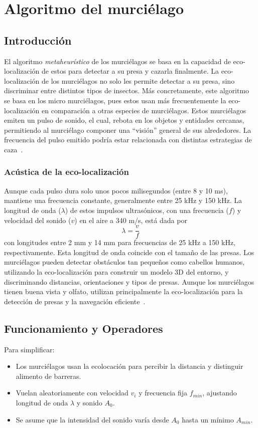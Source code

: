\section{Algoritmo del murciélago}
\subsection{Introducción}
El algoritmo \textit{metaheurístico} de los murciélagos se basa en la capacidad de eco-localización de estos para detectar a su presa y cazarla finalmente. La eco-localización de los murciélagos no solo les permite detectar a su presa, sino discriminar entre distintos tipos de insectos. Más concretamente, este algoritmo se basa en los micro murciélagos, pues estos usan más frecuentemente la eco-localización en comparación a otras especies de murciélagos. Estos murciélagos emiten un pulso de sonido, el cual, rebota en los objetos y entidades cercanas, permitiendo al murciélago componer una ``visión'' general de sus alrededores. La frecuencia del pulso emitido podría estar relacionada con distintas estrategias de caza~\cite{yang_new_2010}.
\subsubsection{Acústica de la eco-localización}
Aunque cada pulso dura solo unos pocos milisegundos (entre 8 y 10 ms), mantiene una frecuencia constante, generalmente entre 25 kHz y 150 kHz. La longitud de onda ($\lambda$) de estos impulsos ultrasónicos, con una frecuencia ($f$) y velocidad del sonido ($v$) en el aire a 340 m/s, está dada por
\begin{equation}
    \lambda = \frac{v}{f}
\end{equation}
con longitudes entre 2 mm y 14 mm para frecuencias de 25 kHz a 150 kHz, respectivamente. Esta longitud de onda coincide con el tamaño de las presas. Los murciélagos pueden detectar obstáculos tan pequeños como cabellos humanos, utilizando la eco-localización para construir un modelo 3D del entorno, y discriminando distancias, orientaciones y tipos de presas. Aunque los murciélagos tienen buena vista y olfato, utilizan principalmente la eco-localización para la detección de presas y la navegación eficiente~\cite{yang_new_2010}.

\subsection{Funcionamiento y Operadores}
Para simplificar:
\begin{itemize}
    \item Los murciélagos usan la ecolocación para percibir la distancia y distinguir alimento de barreras.
    \item Vuelan aleatoriamente con velocidad $v_i$ y frecuencia fija $f_{min}$, ajustando longitud de onda $\lambda$ y sonido $A_0$.
    \item Se asume que la intensidad del sonido varía desde $A_0$ hasta un mínimo $A_{min}$.
\end{itemize}
